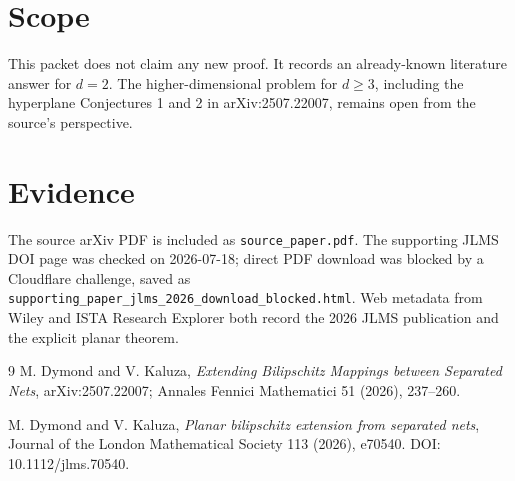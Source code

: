 \documentclass[11pt]{article}
\begin{document}
\section*{Scope}

This packet does not claim any new proof. It records an already-known
literature answer for $d=2$. The higher-dimensional problem for $d\geq 3$,
including the hyperplane Conjectures 1 and 2 in arXiv:2507.22007, remains open
from the source's perspective.

\section*{Evidence}

The source arXiv PDF is included as \texttt{source\_paper.pdf}. The supporting
JLMS DOI page was checked on 2026-07-18; direct PDF download was blocked by a
Cloudflare challenge, saved as
\texttt{supporting\_paper\_jlms\_2026\_download\_blocked.html}. Web metadata
from Wiley and ISTA Research Explorer both record the 2026 JLMS publication and
the explicit planar theorem.

\begin{thebibliography}{9}
M. Dymond and V. Kaluza,
\emph{Extending Bilipschitz Mappings between Separated Nets},
arXiv:2507.22007; Annales Fennici Mathematici 51 (2026), 237--260.

M. Dymond and V. Kaluza,
\emph{Planar bilipschitz extension from separated nets},
Journal of the London Mathematical Society 113 (2026), e70540.
DOI: 10.1112/jlms.70540.
\end{thebibliography}
\end{document}

